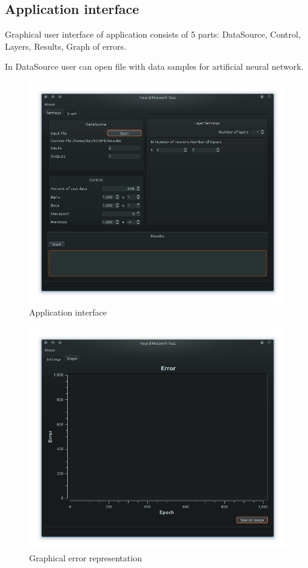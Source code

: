 \documentclass[a4paper,12pt]{article}
\begin{document}
\subsection{Application interface}

Graphical user interface of application consists of 5 parts: DataSource, Control, Layers, Results, Graph of errors.

In DataSource user can open file with data samples for artificial neural network.
\begin{figure}[ht]
 \centering
 \includegraphics[scale=0.6]{images/interface.png}
 \caption{Application interface}
\end{figure}

\begin{figure}[ht]
 \centering
 \includegraphics[scale=0.6]{images/interface1.png}
 \caption{Graphical error representation}
\end{figure}
\end{document}
